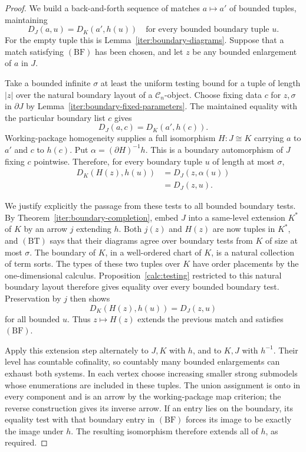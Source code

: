 \begin{proof}
We build a back-and-forth sequence of matches
$a\mapsto a'$ of bounded tuples, maintaining
\[
 D_J(a,u)=D_K(a',h(u))
 \quad\text{for every bounded boundary tuple }u.
 \tag{BF}
\]
For the empty tuple this is
Lemma~\ref{iter:boundary-diagrams}. Suppose that a
match satisfying $(\mathrm{BF})$ has been chosen, and let $z$
be any bounded enlargement of $a$ in $J$.

Take a bounded infinite $\sigma$ at least the uniform
testing bound for a tuple of length $|z|$ over the
natural boundary layout of a $\mathcal C_n$-object.
Choose fixing data $c$ for $z,\sigma$ in $\partial J$
by Lemma~\ref{iter:boundary-fixed-parameters}.
The maintained equality with the particular boundary
list $c$ gives
\[
 D_J(a,c)=D_K(a',h(c)).
\]
Working-package homogeneity supplies a full
isomorphism $H:J\cong K$ carrying $a$ to $a'$ and
$c$ to $h(c)$. Put
$\alpha=(\partial H)^{-1}h$. This is a boundary
automorphism of $J$ fixing $c$ pointwise. Therefore,
for every boundary tuple $u$ of length at most
$\sigma$,
\[
 \begin{split}
 D_K(H(z),h(u))
 &=D_J(z,\alpha(u))\\
 &=D_J(z,u).
 \end{split}
 \tag{BT}
\]

We justify explicitly the passage from these tests
to all bounded boundary tests. By
Theorem~\ref{iter:boundary-completion}, embed $J$
into a same-level extension $K^*$ of $K$ by an arrow
$j$ extending $h$. Both $j(z)$ and $H(z)$ are now
tuples in $K^*$, and $(\mathrm{BT})$ says that their diagrams
agree over boundary tests from $K$ of size at most
$\sigma$. The boundary of $K$, in a well-ordered
chart of $K$, is a natural collection of term sorts.
The types of these two tuples over $K$ have order
placements by the one-dimensional calculus.
Proposition~\ref{calc:testing} restricted to this natural
boundary layout therefore gives equality over every
bounded boundary test. Preservation by $j$ then
shows
\[
 D_K(H(z),h(u))=D_J(z,u)
\]
for all bounded $u$. Thus $z\mapsto H(z)$ extends
the previous match and satisfies $(\mathrm{BF})$.

Apply this extension step alternately to $J,K$ with
$h$, and to $K,J$ with $h^{-1}$. Their level has
countable cofinality, so countably many bounded
enlargements can exhaust both systems. In each
vertex choose increasing smaller strong submodels
whose enumerations are included in these tuples.
The union assignment is onto in every component
and is an arrow by the working-package map
criterion; the reverse construction gives its
inverse arrow. If an entry lies on the boundary,
its equality test with that boundary entry in
$(\mathrm{BF})$ forces its image to be exactly the image
under $h$. The resulting isomorphism therefore
extends all of $h$, as required.
\end{proof}
